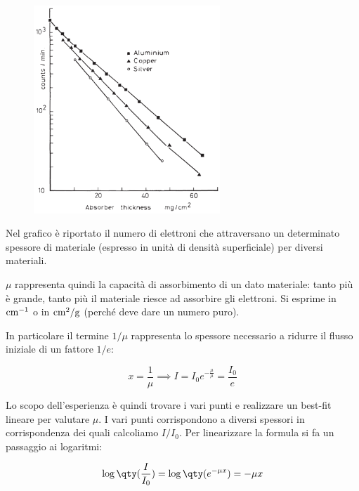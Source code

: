 \begin{minipage}{0.495\textwidth}
    \begin{figure}[H]
        \centering
        \includegraphics[width=7cm]{immagini/assorbimento_elettroni.png}
    \end{figure}
\end{minipage}
\begin{minipage}{0.5\textwidth}
    Nel grafico è riportato il numero di elettroni che attraversano un determinato spessore di materiale (espresso in unità di densità superficiale) per diversi materiali.
    
    $\mu$ rappresenta quindi la capacità di assorbimento di un dato materiale: tanto più è grande, tanto più il materiale riesce ad assorbire gli elettroni. Si esprime in $\rm cm^{-1}$ o in $\rm cm^2/g$ (perché deve dare un numero puro).

    In particolare il termine $1/\mu$ rappresenta lo spessore necessario a ridurre il flusso iniziale di un fattore $1/e$:

    \begin{equation*}
        x=\frac{1}{\mu}
        \implies
        I=I_0 e^{-\frac{\mu}{\mu}}
        =\frac{I_0}{e}
    \end{equation*}
\end{minipage}

\vspace{0.2cm}Lo scopo dell'esperienza è quindi trovare i vari punti e realizzare un best-fit lineare per valutare $\mu$. I vari punti corrispondono a diversi spessori in corrispondenza dei quali calcoliamo $I/I_0$. Per linearizzare la formula si fa un passaggio ai logaritmi:

\begin{equation*}
    \log{\qty(\frac{I}{I_0})}
    =\log{\qty(e^{-\mu x})}
    =-\mu x
\end{equation*}

